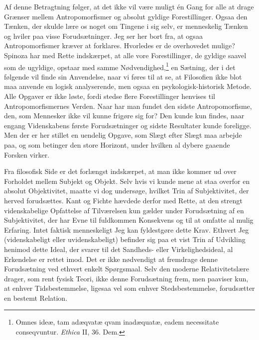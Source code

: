 \documentclass[12pt]{article}
\newcommand{\opage}[1]{\marginnote{\footnotesize\textit{[#1]}}}
\begin{document}
Af denne Betragtning følger, at det ikke vil være muligt én Gang for
alle at drage Grænser mellem Antropomorfismer og absolut gyldige
Forestillinger. Ogsaa den Tænken, der skulde lære os noget om \guillemotright{}Tingene
i sig selv\guillemotleft{}, er menneskelig Tænken og hviler paa visse Forudsætninger.
Jeg ser her bort fra, at ogsaa Antropomorfismer kræver at forklares.
Hvorledes er de overhovedet mulige? Spinoza har med Rette indskærpet,
at alle vore Forestillinger, de gyldige saavel som de ugyldige,
opstaar med samme Nødvendighed,\footnote{Omnes ideæ, tam adæqvatæ qvam
inadæquatæ, eadem necessitate conseqvuntur. \textit{Ethica} II, 36.
Dem.} en Sætning, der i det følgende vil finde sin Anvendelse, naar vi
føres til at se, at Filosofien ikke blot maa anvende en logisk
analyserende, men ogsaa en psykologisk-historisk Metode. Alle Opgaver
er ikke løste, fordi stedse flere Forestillinger henvises til
Antropomorfismernes Verden. Naar har man fundet den sidste
Antropomorfisme, den, som Mennesker ikke vil kunne frigøre sig for?
Den kunde kun findes, naar engang Videnskabens første Forudsætninger
og sidste Resultater kunde foreligge. Men der er her stillet en
uendelig Opgave, som Slægt efter Slægt maa arbejde paa, og som
betinger den store Horizont, under hvilken al dybere gaaende Forsken
virker.

Fra filosofisk Side er det forlængst indskærpet, at man ikke kommer ud
over Forholdet mellem Subjekt og Objekt. Selv hvis vi kunde mene at
staa overfor en absolut
\setcounter{footnote}{0}%
\opage{18}Objektivitet, maatte vi dog undersøge, hvilket Trin af
Subjektivitet, der herved forudsættes. Kant og Fichte hævdede derfor
med Rette, at den strengt videnskabelige Opfattelse af Tilværelsen kun
gælder under Forudsætning af en Subjektivitet, der har Evne til
fuldkommen Konsekvens og til at omfatte al mulig Erfaring. Intet
faktisk menneskeligt Jeg kan fyldestgøre dette Krav. Ethvert Jeg
(videnskabeligt eller uvidenskabeligt) befinder sig paa et vist Trin
af Udvikling henimod dette Ideal, der svarer til det Sandheds- eller
Virkelighedsideal, al Erkendelse er rettet imod. Det er ikke
nødvendigt at fremdrage denne Forudsætning ved ethvert enkelt
Spørgsmaal. Selv den moderne Relativitetslære drager, som rent fysisk
Teori, ikke denne Forudsætning frem, men paaviser kun, at enhver
Tidsbestemmelse, ligesaa vel som enhver Stedsbestemmelse, forudsætter
en bestemt Relation.
\end{document}
